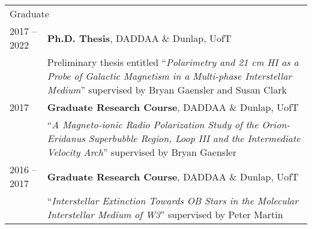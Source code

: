 \documentclass[10pt]{res} %
\begin{document}
\begin{resume}
\begin{table}[h!]
\begin{tabularx}{\textwidth}{ @{} p{6.5em} X @{} }
\multicolumn{2}{l}{ \rule{0pt}{3ex} \large \hspace{-12pt} Graduate \dotfill \rule[-1.2ex]{0pt}{0pt}} \\
2017 -- 2022 & \textbf{Ph.D. Thesis}, DADDAA \& Dunlap, UofT \\
                     & Preliminary thesis entitled ``\textit{Polarimetry and 21 cm HI as a Probe of Galactic Magnetism in a Multi-phase Interstellar Medium}'' supervised by Bryan Gaensler and Susan Clark \\
2017 & \textbf{Graduate Research Course}, DADDAA \& Dunlap, UofT \\
         & ``\textit{A Magneto-ionic Radio Polarization Study of the Orion-Eridanus Superbubble Region, Loop III and the Intermediate Velocity Arch}'' supervised by Bryan Gaensler \\
2016 -- 2017 & \textbf{Graduate Research Course}, DADDAA \& Dunlap, UofT  \\
                     & ``\textit{Interstellar Extinction Towards OB Stars in the Molecular Interstellar Medium of W3}'' supervised by Peter Martin
\end{tabularx}
\end{table}


\end{resume}
\end{document}

